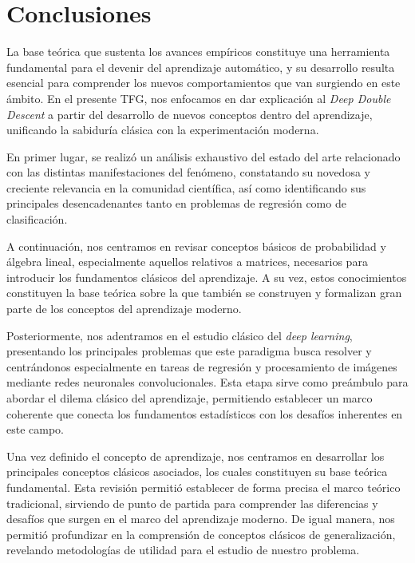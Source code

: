 
\chapter{Conclusiones}\label{ch:conclusiones}

La base teórica que sustenta los avances empíricos constituye una herramienta fundamental para el devenir del aprendizaje automático, y su desarrollo resulta esencial para comprender los nuevos comportamientos que van surgiendo en este ámbito. En el presente TFG, nos enfocamos en dar explicación al \textit{Deep Double Descent} a partir del desarrollo de nuevos conceptos dentro del aprendizaje, unificando la sabiduría clásica con la experimentación moderna.

En primer lugar, se realizó un análisis exhaustivo del estado del arte relacionado con las distintas manifestaciones del fenómeno, constatando su novedosa y creciente relevancia en la comunidad científica, así como identificando sus principales desencadenantes tanto en problemas de regresión como de clasificación.

A continuación, nos centramos en revisar conceptos básicos de probabilidad y álgebra lineal, especialmente aquellos relativos a matrices, necesarios para introducir los fundamentos clásicos del aprendizaje. A su vez, estos conocimientos constituyen la base teórica sobre la que también se construyen y formalizan gran parte de los conceptos del aprendizaje moderno.

Posteriormente, nos adentramos en el estudio clásico del \textit{deep learning}, presentando los principales problemas que este paradigma busca resolver y centrándonos especialmente en tareas de regresión y procesamiento de imágenes mediante redes neuronales convolucionales. Esta etapa sirve como preámbulo para abordar el dilema clásico del aprendizaje, permitiendo establecer un marco coherente que conecta los fundamentos estadísticos con los desafíos inherentes en este campo.

Una vez definido el concepto de aprendizaje, nos centramos en desarrollar los principales conceptos clásicos asociados, los cuales constituyen su base teórica fundamental. Esta revisión permitió establecer de forma precisa el marco teórico tradicional, sirviendo de punto de partida para comprender las diferencias y desafíos que surgen en el marco del aprendizaje moderno. De igual manera, nos permitió profundizar en la comprensión de conceptos clásicos de generalización, revelando metodologías de utilidad para el estudio de nuestro problema.

